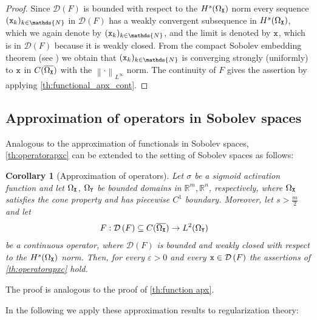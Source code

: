 \documentclass[10pt]{article}
\numberwithin{equation}{section}
\newtheorem{corollary}[corollary]{Corollary}
\theoremstyle{nonumberplain}
\newtheorem{proof}{Proof}
\newcommand{\N}{\mathds{N}}
\newcommand{\R}{\mathds{R}}
\newcommand{\dom}[1]{\mathcal{D}\left(#1\right)}
\newcommand{\norm}[1]{\left\|#1\right\|}
\newcommand{\ve}{\varepsilon}
\newcommand{\X}{{\tt X}}
\newcommand{\Y}{{\tt Y}}
\newcommand{\x}{{\tt x}}
\begin{document}
\begin{proof}

	Since $\dom{F}$ is bounded with respect to the $H^s(\Omega_\X)$ norm
	every sequence $(\x_k)_{k \in \N}$ in $\dom{F}$ has a weakly convergent subsequence in $H^s(\Omega_\X)$, which we again denote by $(\x_k)_{k \in \N}$, and the limit is denoted by $\x$, which is in $\dom{F}$ because it is weakly closed. From the compact Sobolev embedding theorem (see \cite[Thm. 6.2]{Ada75}) we obtain that $(\x_k)_{k \in \N}$ is converging strongly (uniformly) to $\x$ in $C(\overline{\Omega_\X})$ with the $\norm{\cdot}_{L^\infty}$ norm. The continuity of $F$ gives the assertion by applying \autoref{th:functional_apx_cont}.
\end{proof}

\subsection{Approximation of operators in Sobolev spaces}\label{sec:sobolevproof}
Analogous to the approximation of functionals in Sobolev spaces, \autoref{th:operatorapxc} can be extended to the setting of Sobolev spaces as follows:

\begin{corollary}[Approximation of operators]\label{th:operatorapx}
	Let $\sigma$ be a sigmoid activation function and let $\Omega_\X$, $\Omega_\Y$ be bounded domains in $\R^m, \R^n$, respectively, where $\Omega_\X$ satisfies the cone property and has piecewise $C^1$ boundary. Moreover, let $s>\frac{m}{2}$ and let
	\begin{align*}
		F: \dom{F} \subseteq C(\overline{\Omega_\X}) &\to L^2(\Omega_\Y)
	\end{align*}
	be a continuous operator, where $\dom{F}$ is bounded and weakly closed with respect to the $H^s(\Omega_\X)$ norm. Then, for every $\ve > 0$ and every $\x \in \dom{F}$ the assertions of \autoref{th:operatorapxc} hold.
\end{corollary}
The proof is analogous to the proof of \autoref{th:function apx}.

In the following we apply these approximation results to regularization theory:
\end{document}
